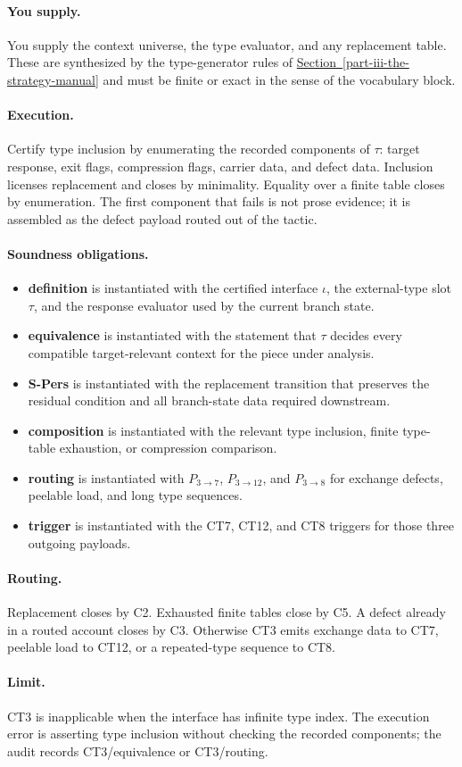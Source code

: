 \documentclass[
  11pt,
]{article}
\providecommand{\tightlist}{%
  \setlength{\itemsep}{0pt}\setlength{\parskip}{0pt}}
\theoremstyle{definition}
\newcommand{\secref}[1]{\hyperref[#1]{Section~\ref*{#1}}}
\newcommand{\ctpar}[1]{\paragraph{#1.}}
\begin{document}
\ctpar{You supply}
You supply the context universe, the type evaluator, and any replacement
table.  These are synthesized by the type-generator rules of \secref{part-iii-the-strategy-manual} and
must be finite or exact in the sense of the vocabulary block.

\ctpar{Execution}
Certify type inclusion by enumerating the recorded components of
\(\tau\): target response, exit flags, compression flags, carrier data,
and defect data.  Inclusion licenses replacement and closes by
minimality.  Equality over a finite table closes by enumeration.  The
first component that fails is not prose evidence; it is assembled as the
defect payload routed out of the tactic.

\ctpar{Soundness obligations}
\begin{itemize}
\tightlist
\item \textbf{definition} is instantiated with the certified interface \(\iota\), the external-type slot \(\tau\), and the response evaluator used by the current branch state.
\item \textbf{equivalence} is instantiated with the statement that \(\tau\) decides every compatible target-relevant context for the piece under analysis.
\item \textbf{S-Pers} is instantiated with the replacement transition that preserves the residual condition and all branch-state data required downstream.
\item \textbf{composition} is instantiated with the relevant type inclusion, finite type-table exhaustion, or compression comparison.
\item \textbf{routing} is instantiated with \(P_{3\to7}\), \(P_{3\to12}\), and \(P_{3\to8}\) for exchange defects, peelable load, and long type sequences.
\item \textbf{trigger} is instantiated with the CT7, CT12, and CT8 triggers for those three outgoing payloads.
\end{itemize}

\ctpar{Routing}
Replacement closes by C2.  Exhausted finite tables close by C5.  A defect
already in a routed account closes by C3.  Otherwise CT3 emits exchange
data to CT7, peelable load to CT12, or a repeated-type sequence to CT8.

\ctpar{Limit}
CT3 is inapplicable when the interface has infinite type index. The
execution error is asserting type inclusion without checking the recorded
components; the audit records CT3/equivalence or CT3/routing.
\end{document}
